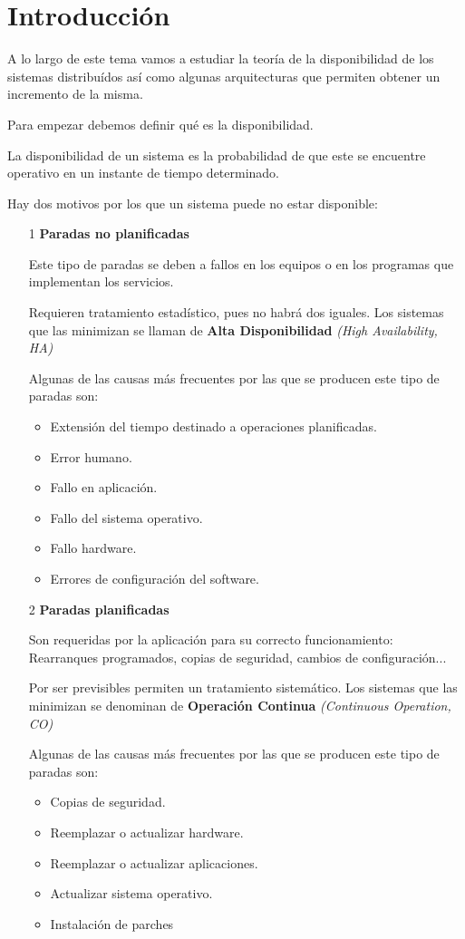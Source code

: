 \section{Introducción}
A lo largo de este tema vamos a estudiar la teoría de la disponibilidad de los sistemas distribuídos así como algunas arquitecturas que permiten obtener un incremento de la misma.

Para empezar debemos definir qué es la disponibilidad.

\begin{defn}[Disponibilidad]
La disponibilidad de un sistema es la probabilidad de que este se encuentre operativo en un instante de tiempo determinado.
\end{defn}

Hay dos motivos por los que un sistema puede no estar disponible:
\begin{enumerate}
\item[1] \textbf{Paradas no planificadas}

Este tipo de paradas se deben a fallos en los equipos o en los programas que implementan los servicios.

Requieren tratamiento estadístico, pues no habrá dos iguales. Los sistemas que las minimizan se llaman de \textbf{Alta Disponibilidad} \textit{(High Availability, HA)}


Algunas de las causas más frecuentes por las que se producen este tipo de paradas son:

\begin{itemize}
\item Extensión del tiempo destinado a operaciones planificadas.
\item Error humano.
\item Fallo en aplicación.
\item Fallo del sistema operativo.
\item Fallo hardware.
\item Errores de configuración del software.
\end{itemize}

\item[2] \textbf{Paradas planificadas}

Son requeridas por la aplicación para su correcto funcionamiento: Rearranques programados, copias de seguridad, cambios de configuración...

Por ser previsibles permiten un tratamiento sistemático. Los sistemas que las minimizan se denominan de \textbf{Operación Continua} \textit{(Continuous Operation, CO)}

Algunas de las causas más frecuentes por las que se producen este tipo de paradas son:

\begin{itemize}
\item Copias de seguridad.
\item Reemplazar o actualizar hardware.
\item Reemplazar o actualizar aplicaciones.
\item Actualizar sistema operativo.
\item Instalación de parches
\end{itemize}
\end{enumerate}

